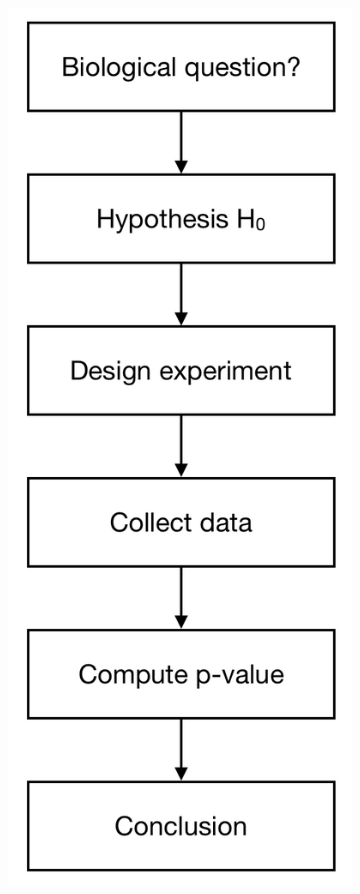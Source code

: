 \begin{figure}[ht!]
\centering
\begin{subfigure}{0.3\textwidth}
    \includegraphics[height=0.5\textheight]{main_figures/intro/fisher_paradigm.png}

\end{subfigure}
\end{figure}
